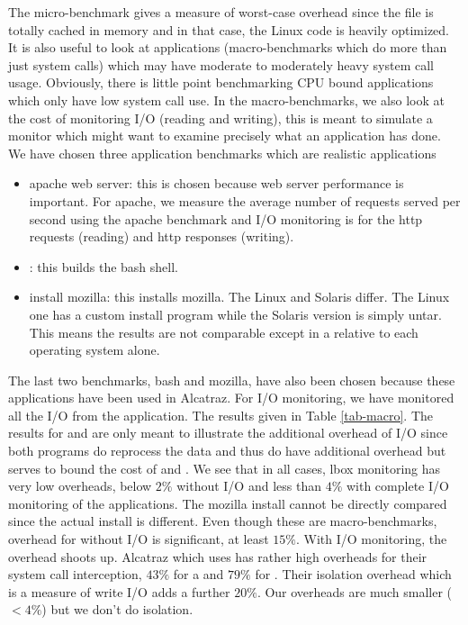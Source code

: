 The  micro-benchmark gives a measure of worst-case overhead
since the file is totally cached in memory and in that case, the Linux
 code is heavily optimized.
It is also useful to look at applications (macro-benchmarks
which do more than just system calls) which may have moderate to
moderately heavy system call usage. Obviously, there is little point
benchmarking CPU bound applications which only have low system call use.
In the macro-benchmarks, we also look at the cost of monitoring 
I/O (reading and writing), this is meant to simulate a monitor which might
want to examine precisely what an application has done.
We have chosen three application benchmarks which are realistic applications
\begin{itemize}
\item apache web server: this is chosen because web server performance
is important.
For apache, we measure the average number of requests served per second
using the apache  benchmark and I/O monitoring is for
the http requests (reading) and http responses (writing).

\item {}: this builds the bash shell.

\item install mozilla: this installs mozilla. The
Linux and Solaris differ. The Linux one has a custom
install program while the Solaris version is simply untar.
This means the results are not comparable except in a relative
to each operating system alone.
\end{itemize}

The last two benchmarks, bash and mozilla,
have also been chosen because these applications
have been used in Alcatraz.
For I/O monitoring, we have monitored all the I/O from the application.
The results given in Table \ref{tab-macro}. 
The results for  and  are only meant to illustrate
the additional overhead of I/O since both programs do reprocess the data
and thus do have additional overhead but 
serves to bound the cost of  and .
We see that in all cases, lbox monitoring has very low overheads, below
$2\%$ without I/O and less than $4\%$ with complete I/O monitoring of the
applications.
The mozilla install cannot be directly compared since the actual install
is different.
Even though these are macro-benchmarks, 
overhead for  without I/O is significant, at least $15\%$.
With I/O monitoring, the overhead shoots up.
Alcatraz \cite{alcatraz} which uses  has rather
high overheads for their system call interception, $43\%$ for a 
and $79\%$ for . Their isolation overhead which is a measure
of write I/O adds a further $20\%$. Our overheads are much smaller ($< 4\%$)
but we don't do isolation.


